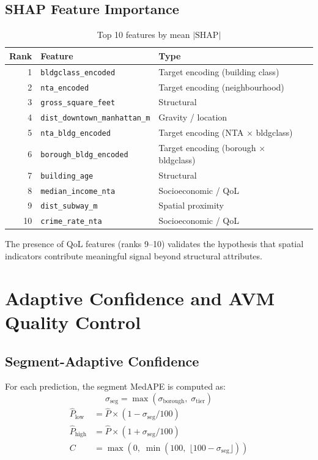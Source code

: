 \documentclass[11pt, a4paper, twoside]{article}
\begin{document}
\subsection{SHAP Feature Importance}
\begin{table}[H]
  \centering
  \caption{Top 10 features by mean $|\text{SHAP}|$}
  \label{tab:shap_top10}
  \begin{tabular}{rlll}
    \toprule
    Rank & Feature & Type \\
    \midrule
    1  & \texttt{bldgclass\_encoded}          & Target encoding (building class) \\
    2  & \texttt{nta\_encoded}                & Target encoding (neighbourhood) \\
    3  & \texttt{gross\_square\_feet}          & Structural \\
    4  & \texttt{dist\_downtown\_manhattan\_m} & Gravity / location \\
    5  & \texttt{nta\_bldg\_encoded}           & Target encoding (NTA $\times$ bldgclass) \\
    6  & \texttt{borough\_bldg\_encoded}       & Target encoding (borough $\times$ bldgclass) \\
    7  & \texttt{building\_age}                & Structural \\
    8  & \texttt{median\_income\_nta}          & Socioeconomic / QoL \\
    9  & \texttt{dist\_subway\_m}              & Spatial proximity \\
    10 & \texttt{crime\_rate\_nta}             & Socioeconomic / QoL \\
    \bottomrule
  \end{tabular}
\end{table}
The presence of QoL features (ranks 9--10) validates the hypothesis that
spatial indicators contribute meaningful signal beyond structural attributes.

\section{Adaptive Confidence and AVM Quality Control}
\label{sec:confidence}

\subsection{Segment-Adaptive Confidence}
For each prediction, the segment MedAPE is computed as:
\begin{equation}
  \sigma_{\text{seg}} = \max(\sigma_{\text{borough}},\; \sigma_{\text{tier}})
\end{equation}
\begin{align}
  \hat{P}_{\text{low}}  &= \hat{P} \times (1 - \sigma_{\text{seg}} / 100) \\
  \hat{P}_{\text{high}} &= \hat{P} \times (1 + \sigma_{\text{seg}} / 100) \\
  C &= \max(0,\;\min(100,\;\lfloor 100 - \sigma_{\text{seg}} \rfloor))
\end{align}
\end{document}
